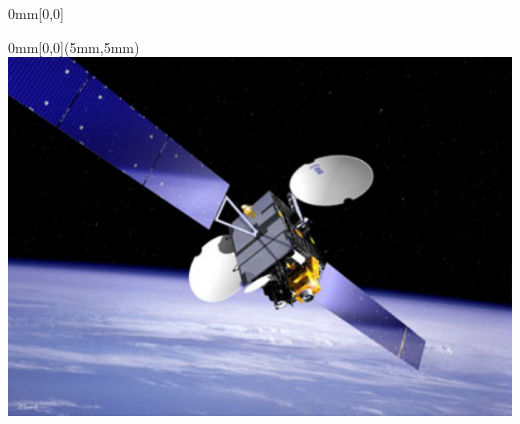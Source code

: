 \begin{frame}{}
{\begin{textblock*}{0mm}[0,0]
\end{textblock*}}
\begin{textblock*}{0mm}[0,0](5mm,5mm)
\includegraphics[scale=0.5,clip=true,angle=15,trim=0 30 35 0]{images/3rdparty/esa-satellite}%
\end{textblock*}
\end{frame}

